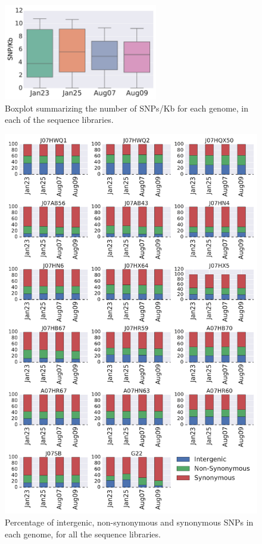 %
\begin{figure}[h]
  \centering
  \includegraphics[width=0.6\textwidth,height=\textheight,keepaspectratio]{Chapter5/Figures/Boxplot_SNPsKB.pdf}
  \caption{Boxplot summarizing the number of SNPs/Kb for each genome, in each of the sequence libraries.}
  \label{BoxplotSNPsKB}
\end{figure}


\begin{figure}[h]
  \centering
  \includegraphics[width=\textwidth,height=0.8\textheight,keepaspectratio]{Chapter5/Figures/SNPsummary.pdf}
  \caption{Percentage of intergenic, non-synonymous and synonymous SNPs in each genome, for all the sequence libraries.}
  \label{SNPsummary}
\end{figure}

